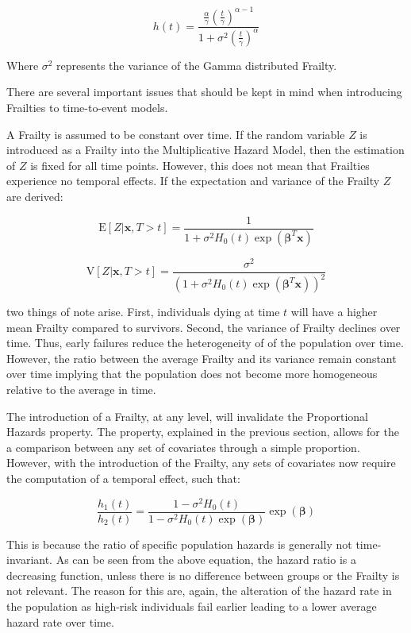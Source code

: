 $$ h(t) = \frac{\frac{\alpha}{\gamma}\left (\frac{t}{\gamma}  \right )^{\alpha - 1}}{1 + \sigma^2 \left (\frac{t}{\gamma}  \right )^{\alpha} } $$

Where $\sigma^2$ represents the variance of the Gamma distributed Frailty.


There are several important issues that should be kept in mind when introducing Frailties to time-to-event models.

A Frailty is assumed to be constant over time. If the random variable $Z$ is introduced as a Frailty into the Multiplicative Hazard Model, then the estimation of $Z$ is fixed for all time points. However, this does not mean that Frailties experience no temporal effects. If the expectation and variance of the Frailty $Z$ are derived:

$$\mathrm{E}[Z|\textbf{x},  T > t ] = \frac{1}{1 + \sigma^2 H_0(t) \exp(\boldsymbol\beta^T \textbf{x})} $$

$$ \mathrm{V}[Z|\textbf{x},  T > t ] = \frac{\sigma^2}{(1 + \sigma^2 H_0(t) \exp(\boldsymbol\beta^T \textbf{x}))^2} $$

two things of note arise. First, individuals dying at time $t$ will have a higher mean Frailty compared to survivors. Second, the variance of Frailty declines over time. Thus, early failures reduce the heterogeneity of of the population over time. However, the ratio between the average Frailty and its variance remain constant over time implying that the population does not become more homogeneous relative to the average in time\cite{Wienke2010}.

The introduction of a Frailty, at any level, will invalidate the Proportional Hazards property\cite{Kleinbaum2005}. The property, explained in the previous section, allows for the a comparison between any set of covariates through a simple proportion. However, with the introduction of the Frailty, any sets of covariates now require the computation of a temporal effect, such that:

$$ \frac{h_1(t)}{h_2(t)} = \frac{1 - \sigma^2 H_0(t)}{1 - \sigma^2 H_0(t) \exp(\boldsymbol\beta)} \exp(\boldsymbol\beta) $$

This is because the ratio of specific population hazards is generally not time-invariant. As can be seen from the above equation, the hazard ratio is a decreasing function, unless there is no difference between groups or the Frailty is not relevant. The reason for this are, again, the alteration of the hazard rate in the population as high-risk individuals fail earlier leading to a lower average hazard rate over time.

